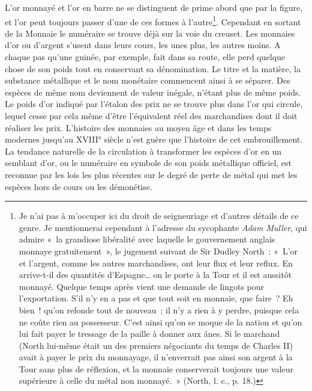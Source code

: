 \documentclass[french,twoside]{book} %
\begin{document}
L’or monnayé et l’or en barre ne se distinguent de prime abord que par la figure, et l’or peut toujours passer d’une de ces formes à l’autre\footnote{Je n’ai pas à m’occuper ici du droit de seigneuriage et d’autres détails de ce genre. Je mentionnerai cependant à l’adresse du sycophante \emph{Adam Muller}, qui admire « la grandiose libéralité avec laquelle le gouvernement anglais monnaye gratuitement », le jugement suivant de Sir Dudley North : « L’or et l’argent, comme les autres marchandises, ont leur flux et leur reflux. En arrive-t‑il des quantités d’Espagne… on le porte à la Tour et il est aussitôt monnayé. Quelque temps après vient une demande de lingots pour l’exportation. S’il n’y en a pas et que tout soit en monnaie, que faire ? Eh bien ! qu’on refonde tout de nouveau ; il n’y a rien à y perdre, puisque cela ne coûte rien au possesseur. C’est ainsi qu’on se moque de la nation et qu’on lui fait payer le tressage de la paille à donner aux ânes. Si le marchand (North lui‑même était un des premiers négociants du temps de Charles II) avait à payer le prix du monnayage, il n’enverrait pas ainsi son argent à la Tour sans plus de réflexion, et la monnaie conserverait toujours une valeur supérieure à celle du métal non monnayé. » (North, l. c., p. 18.)}. Cependant en sortant de la Monnaie le numéraire se trouve déjà sur la voie du creuset. Les monnaies d’or ou d’argent s’usent dans leurs cours, les unes plus, les autres moins. A chaque pas qu’une guinée, par exemple, fait dans sa route, elle perd quelque chose de son poids tout en conservant sa dénomination. Le titre et la matière, la substance métallique et le nom monétaire commencent ainsi à se séparer. Des espèces de même nom deviennent de valeur inégale, n’étant plus de même poids. Le poids d’or indiqué par l’étalon des prix ne se trouve plus dans l’or qui circule, lequel cesse par cela même d’être l’équivalent réel des marchandises dont il doit réaliser les prix. L’histoire des monnaies au moyen âge et dans les temps modernes jusqu’au XVIII° siècle n’est guère que l’histoire de cet embrouillement. La tendance naturelle de la circulation à transformer les espèces d’or en un semblant d’or, ou le numéraire en symbole de son poids métallique officiel, est reconnue par les lois les plus récentes sur le degré de perte de métal qui met les espèces hors de cours ou les démonétise.\par
\end{document}
